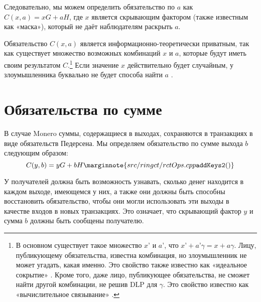 
Следовательно, мы можем определить обязательство по \(a\) как \(C(x, a) = x G + a H\), где \(x\) является скрывающим фактором (также известным как «маска»), который не даёт наблюда\-телям раскрыть $a$.

Обязательство $C(x, a)$ является информационно-теоретически приватным, так как существует множество возможных комбинаций $x$ и $a$, которые будут иметь своим результатом $C$.\footnote{В основном существует такое множество $x’$ и $a’$, что $x’+a’ \gamma = x+a \gamma$. Лицу, публикующему обязательства, известна комбинация, но злоумышленник не может угадать, какая именно. Это свойство также известно как «идеальное сокрытие» \cite{adam-zero-to-bulletproofs}. Кроме того, даже лицо, публикующее обязательства, не сможет найти другой комбинации, не решив DLP для $\gamma$. Это свойство известно как «вычислительное связывание» \cite{adam-zero-to-bulletproofs}.} Если значение $x$ действительно будет случайным, у злоумышленника буквально не будет способа найти $a$ \cite{maxwell-ct, SCOZZAFAVA1993313}.%



\section{Обязательства по сумме}
\label{sec:pedersen_monero}

В случае Monero суммы, содержащиеся в выходах, сохраняются в транзакциях в виде обяза\-тельств Педерсена. Мы определяем обязательство по сумме выхода $b$ следующим образом:\vspace{.175cm}
\[C(y,b) = y G + b H\marginnote{src/ringct/ rctOps.cpp {\tt addKeys2()}}\]

У получателей должна быть возможность узнавать, сколько денег находится в каждом выхо\-де, имеющемся у них, а также они должны быть способны восстановить обязательство, чтобы они могли использовать эти выходы в качестве входов в новых транзакциях. Это означает, что скрывающий фактор $y$ и сумма $b$ должны быть сообщены получателю.

